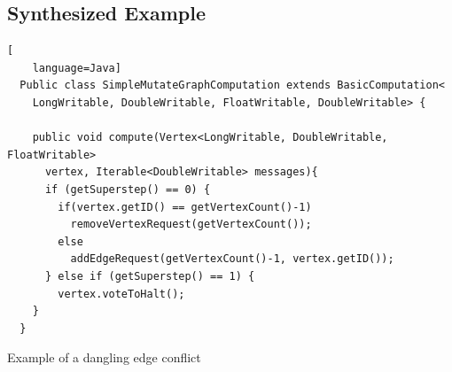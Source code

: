 \subsection{Synthesized Example}
\begin{frame}[fragile]
\begin{lstlisting}[
    language=Java]
  Public class SimpleMutateGraphComputation extends BasicComputation<
    LongWritable, DoubleWritable, FloatWritable, DoubleWritable> {

    public void compute(Vertex<LongWritable, DoubleWritable, FloatWritable>
      vertex, Iterable<DoubleWritable> messages){
      if (getSuperstep() == 0) {
        if(vertex.getID() == getVertexCount()-1)
          removeVertexRequest(getVertexCount());
        else
          addEdgeRequest(getVertexCount()-1, vertex.getID());
      } else if (getSuperstep() == 1) {
        vertex.voteToHalt();
    }
  }
\end{lstlisting}
Example of a dangling edge conflict
\end{frame}
